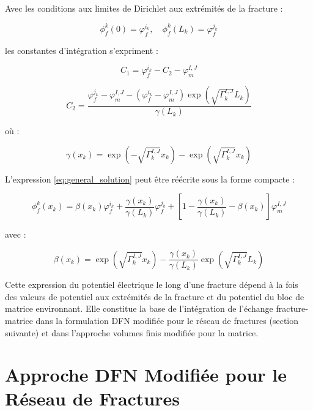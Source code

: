 Avec les conditions aux limites de Dirichlet aux extrémités de la fracture :

\begin{equation}
\phi_f^k(0) = \varphi_f^{i_k}, \quad \phi_f^k(L_k) = \varphi_f^{j_k}
\end{equation}

les constantes d'intégration s'expriment :

\begin{equation}
C_1 = \varphi_f^{i_k} - C_2 - \varphi_m^{I,J}
\label{eq:C1}
\end{equation}

\begin{equation}
C_2 = \frac{\varphi_f^{j_k} - \varphi_m^{I,J} - (\varphi_f^{i_k} - \varphi_m^{I,J})\exp(\sqrt{\Gamma_k^{I,J}}L_k)}{\gamma(L_k)}
\label{eq:C2}
\end{equation}

où :

\begin{equation}
\gamma(x_k) = \exp(-\sqrt{\Gamma_k^{I,J}} x_k) - \exp(\sqrt{\Gamma_k^{I,J}} x_k)
\end{equation}

L'expression \eqref{eq:general_solution} peut être réécrite sous la forme compacte :

\begin{equation}
\phi_f^k(x_k) = \beta(x_k) \varphi_f^{i_k} + \frac{\gamma(x_k)}{\gamma(L_k)} \varphi_f^{j_k} + \left[1 - \frac{\gamma(x_k)}{\gamma(L_k)} - \beta(x_k)\right] \varphi_m^{I,J}
\label{eq:potential_compact}
\end{equation}

avec :

\begin{equation}
\beta(x_k) = \exp(\sqrt{\Gamma_k^{I,J}} x_k) - \frac{\gamma(x_k)}{\gamma(L_k)} \exp(\sqrt{\Gamma_k^{I,J}} L_k)
\end{equation}

Cette expression du potentiel électrique le long d'une fracture dépend à la fois des valeurs de potentiel aux extrémités de la fracture et du potentiel du bloc de matrice environnant. Elle constitue la base de l'intégration de l'échange fracture-matrice dans la formulation DFN modifiée pour le réseau de fractures (section suivante) et dans l'approche volumes finis modifiée pour la matrice.

\section{Approche DFN Modifiée pour le Réseau de Fractures}
\label{sec:dfn}

